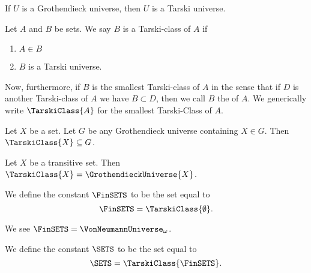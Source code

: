 \begin{theorem}
If $U$ is a Grothendieck universe, then $U$ is a Tarski universe.
\end{theorem}

\begin{definition}
Let $A$ and $B$ be sets. We say $B$ is a Tarski-class of $A$ if
\begin{enumerate}
\item $A\in B$
\item $B$ is a Tarski universe.
\end{enumerate}
Now, furthermore, if $B$ is the smallest Tarski-class of $A$ in the
sense that if $D$ is another Tarski-class of $A$ we have $B\subset D$,
then we call $B$ the  of $A$. We generically
write $\TarskiClass{A}$ for the smallest Tarski-Class of $A$.
\end{definition}

\begin{theorem}
Let $X$ be a set. Let $G$ be any Grothendieck universe containing $X\in G$.
Then $\TarskiClass{X}\subset G$.
\end{theorem}

\begin{theorem}
Let $X$ be a transitive set. Then $\TarskiClass{X} = \GrothendieckUniverse{X}$.
\end{theorem}

\begin{definition}
We define the constant $\FinSETS$ to be the set equal to
\begin{equation}
\FinSETS = \TarskiClass{\emptyset}.
\end{equation}
\end{definition}

\begin{theorem}
We see $\FinSETS = \VonNeumannUniverse_{\omega}$.
\end{theorem}

\begin{definition}
We define the constant $\SETS$ to be the set equal to
\begin{equation}
\SETS = \TarskiClass{\FinSETS}.
\end{equation}
\end{definition}

